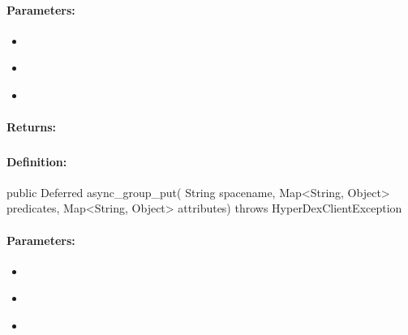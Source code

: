 \paragraph{Parameters:}
\begin{itemize}[noitemsep]
\item {}\\

\item {}\\

\item {}\\

\end{itemize}

\paragraph{Returns:}


\pagebreak
\subsubsection{}
\label{api:java:async_group_put}


\paragraph{Definition:}
\begin{javacode}
public Deferred async_group_put(
        String spacename,
        Map<String, Object> predicates,
        Map<String, Object> attributes) throws HyperDexClientException
\end{javacode}

\paragraph{Parameters:}
\begin{itemize}[noitemsep]
\item {}\\

\item {}\\

\item {}\\

\end{itemize}

